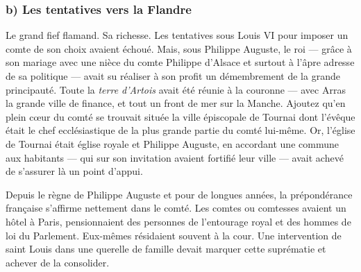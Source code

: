 \documentclass[french,twoside]{book} %
\begin{document}
\subsubsection[b) Les tentatives vers la Flandre]{b) Les tentatives vers la Flandre}
\noindent Le grand fief flamand. Sa richesse. Les tentatives sous Louis VI pour imposer un comte de son choix avaient échoué. Mais, sous Philippe Auguste, le roi — grâce à son mariage avec une nièce du comte Philippe d’Alsace et surtout à l’âpre adresse de sa politique — avait su réaliser à son profit un démembrement de la grande principauté. Toute la \emph{terre d’Artois} avait été réunie à la couronne — avec Arras la grande ville de finance, et tout un front de mer sur la Manche. Ajoutez qu’en plein cœur du comté se trouvait située la ville épiscopale de Tournai dont l’évêque était le chef ecclésiastique de la plus grande partie du comté lui-même. Or, l’église de Tournai était église royale et Philippe Auguste, en accordant une commune aux habitants — qui sur son invitation avaient fortifié leur ville — avait achevé de s’assurer là un point d’appui.\par
Depuis le règne de Philippe Auguste et pour de longues années, la prépondérance française s’affirme nettement dans le comté. Les comtes ou comtesses avaient un hôtel à Paris, pensionnaient des personnes de l’entourage royal et des hommes de loi du Parlement. Eux-mêmes résidaient souvent à la cour. Une intervention de saint Louis dans une querelle de famille devait marquer cette suprématie et achever de la consolider.\par
\end{document}
